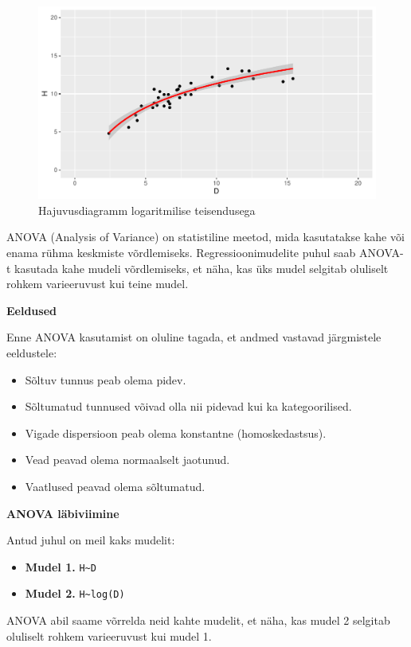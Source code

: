 \documentclass[
]{book}
\providecommand{\tightlist}{%
  \setlength{\itemsep}{0pt}\setlength{\parskip}{0pt}}
\begin{document}
\begin{figure}[H]
\includegraphics[width=0.8\linewidth]{_main_files/figure-latex/unnamed-chunk-49-1} \caption{Hajuvusdiagramm logaritmilise teisendusega}\label{fig:unnamed-chunk-49}
\end{figure}

ANOVA (Analysis of Variance) on statistiline meetod, mida kasutatakse kahe või enama rühma keskmiste võrdlemiseks. Regressioonimudelite puhul saab ANOVA-t kasutada kahe mudeli võrdlemiseks, et näha, kas üks mudel selgitab oluliselt rohkem varieeruvust kui teine mudel.

\textbf{Eeldused}

Enne ANOVA kasutamist on oluline tagada, et andmed vastavad järgmistele eeldustele:

\begin{itemize}
\tightlist
\item
  Sõltuv tunnus peab olema pidev.
\item
  Sõltumatud tunnused võivad olla nii pidevad kui ka kategoorilised.
\item
  Vigade dispersioon peab olema konstantne (homoskedastsus).
\item
  Vead peavad olema normaalselt jaotunud.
\item
  Vaatlused peavad olema sõltumatud.
\end{itemize}

\textbf{ANOVA läbiviimine}

Antud juhul on meil kaks mudelit:

\begin{itemize}
\tightlist
\item
  \textbf{Mudel 1.} \texttt{H\textasciitilde{}D}
\item
  \textbf{Mudel 2.} \texttt{H\textasciitilde{}log(D)}
\end{itemize}

ANOVA abil saame võrrelda neid kahte mudelit, et näha, kas mudel 2 selgitab oluliselt rohkem varieeruvust kui mudel 1.
\end{document}
